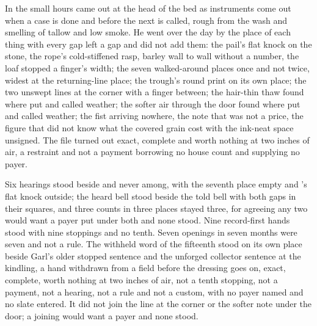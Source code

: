 In the small hours  came out at the head of the bed as instruments come out when a case is done and before the next is called, rough from the wash and smelling of tallow and low smoke. He went over the day by the place of each thing with every gap left a gap and did not add them: the pail's flat knock on the stone, the rope's cold-stiffened rasp, barley wall to wall without a number, the loaf stopped a finger's width; the seven walked-around places once and not twice, widest at the returning-line place; the trough's round print on its own place; the two unswept lines at the corner with a finger between; the hair-thin thaw found where put and called weather; the softer air through the door found where put and called weather; the fist arriving nowhere, the note that was not a price, the figure that did not know what the covered grain cost with the ink-neat space unsigned. The file turned out exact, complete and worth nothing at two inches of air, a restraint and not a payment borrowing no house count and supplying no payer.

Six hearings stood beside and never among, with the seventh place empty and 's flat knock outside; the heard bell stood beside the told bell with both gaps in their squares, and three counts in three places stayed three, for agreeing any two would want a payer put under both and none stood. Nine record-first hands stood with nine stoppings and no tenth. Seven openings in seven months were seven and not a rule. The withheld word of the fifteenth stood on its own place beside Garl's older stopped sentence and the unforged collector sentence at the kindling, a hand withdrawn from a field before the dressing goes on, exact, complete, worth nothing at two inches of air, not a tenth stopping, not a payment, not a hearing, not a rule and not a custom, with no payer named and no slate entered. It did not join the line at the corner or the softer note under the door; a joining would want a payer and none stood.

